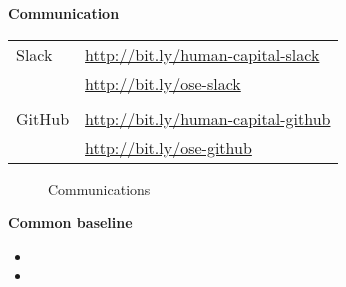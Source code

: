 \begin{frame}[c]
\begin{figure}
\end{figure}
\end{frame}
\begin{frame}
\textbf{Communication}\\\vspace{0.5cm}
\begin{tabular}{ll}
Slack     & \url{http://bit.ly/human-capital-slack} \\
          & \url{http://bit.ly/ose-slack} \\
          &                                          \\
GitHub    & \url{http://bit.ly/human-capital-github} \\
          & \url{http://bit.ly/ose-github} \\
\end{tabular}
\end{frame}
\begin{frame}
\begin{figure}[htp]\centering
\caption{Communications}
\end{figure}
\end{frame}
\begin{frame}\textbf{Common baseline}\vspace{0.5cm}

\begin{itemize}\setlength\itemsep{1em}
\item {}
\item {}
\end{itemize}

\end{frame}
